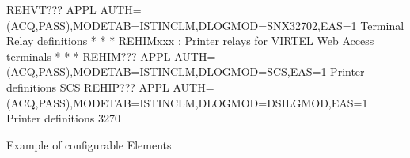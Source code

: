 \documentclass[letterpaper,10pt,english]{sphinxmanual}
\begin{document}
\begin{sphinxVerbatim}[commandchars=\\\{\}]
REHVT??? APPL  AUTH=(ACQ,PASS),MODETAB=ISTINCLM,DLOGMOD=SNX32702,EAS=1          \PYGZlt{}\PYGZhy{}\PYGZhy{}\PYGZhy{}\PYGZhy{} Terminal  Relay definitions
* \PYGZhy{}\PYGZhy{}\PYGZhy{}\PYGZhy{}\PYGZhy{}\PYGZhy{}\PYGZhy{}\PYGZhy{}\PYGZhy{}\PYGZhy{}\PYGZhy{}\PYGZhy{}\PYGZhy{}\PYGZhy{}\PYGZhy{}\PYGZhy{}\PYGZhy{}\PYGZhy{}\PYGZhy{}\PYGZhy{}\PYGZhy{}\PYGZhy{}\PYGZhy{}\PYGZhy{}\PYGZhy{}\PYGZhy{}\PYGZhy{}\PYGZhy{}\PYGZhy{}\PYGZhy{}\PYGZhy{}\PYGZhy{}\PYGZhy{}\PYGZhy{}\PYGZhy{}\PYGZhy{}\PYGZhy{}\PYGZhy{}\PYGZhy{}\PYGZhy{}\PYGZhy{}\PYGZhy{}\PYGZhy{}\PYGZhy{}\PYGZhy{}\PYGZhy{}\PYGZhy{}\PYGZhy{}\PYGZhy{}\PYGZhy{}\PYGZhy{}\PYGZhy{}\PYGZhy{}\PYGZhy{}\PYGZhy{}\PYGZhy{}\PYGZhy{}\PYGZhy{}\PYGZhy{}\PYGZhy{}\PYGZhy{}\PYGZhy{}\PYGZhy{}\PYGZhy{}\PYGZhy{}\PYGZhy{} *
* REHIMxxx    : Printer relays for VIRTEL Web Access terminals       *
* \PYGZhy{}\PYGZhy{}\PYGZhy{}\PYGZhy{}\PYGZhy{}\PYGZhy{}\PYGZhy{}\PYGZhy{}\PYGZhy{}\PYGZhy{}\PYGZhy{}\PYGZhy{}\PYGZhy{}\PYGZhy{}\PYGZhy{}\PYGZhy{}\PYGZhy{}\PYGZhy{}\PYGZhy{}\PYGZhy{}\PYGZhy{}\PYGZhy{}\PYGZhy{}\PYGZhy{}\PYGZhy{}\PYGZhy{}\PYGZhy{}\PYGZhy{}\PYGZhy{}\PYGZhy{}\PYGZhy{}\PYGZhy{}\PYGZhy{}\PYGZhy{}\PYGZhy{}\PYGZhy{}\PYGZhy{}\PYGZhy{}\PYGZhy{}\PYGZhy{}\PYGZhy{}\PYGZhy{}\PYGZhy{}\PYGZhy{}\PYGZhy{}\PYGZhy{}\PYGZhy{}\PYGZhy{}\PYGZhy{}\PYGZhy{}\PYGZhy{}\PYGZhy{}\PYGZhy{}\PYGZhy{}\PYGZhy{}\PYGZhy{}\PYGZhy{}\PYGZhy{}\PYGZhy{}\PYGZhy{}\PYGZhy{}\PYGZhy{}\PYGZhy{}\PYGZhy{}\PYGZhy{}\PYGZhy{} *
REHIM??? APPL  AUTH=(ACQ,PASS),MODETAB=ISTINCLM,DLOGMOD=SCS,EAS=1               \PYGZlt{}\PYGZhy{}\PYGZhy{}\PYGZhy{} Printer definitions SCS
REHIP??? APPL  AUTH=(ACQ,PASS),MODETAB=ISTINCLM,DLOGMOD=DSILGMOD,EAS=1          \PYGZlt{}\PYGZhy{}\PYGZhy{}\PYGZhy{} Printer definitions 3270
\end{sphinxVerbatim}

\newpage

Example of configurable Elements


\newpage
\end{document}
